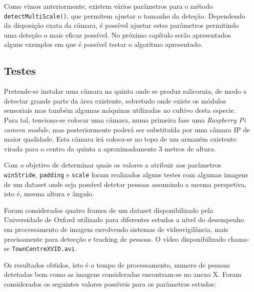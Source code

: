Como vimos anteriormente, existem vários parâmetros para o método \linebreak \texttt{detectMultiScale()}, que permitem ajustar o tamanho da deteção. Dependendo da disposição exata da câmara, é possível ajustar estes parâmetros permitindo uma deteção o mais eficaz possível. No próximo capítulo serão apresentados alguns exemplos em que é possível testar o algoritmo apresentado.  




\iffalse


\subsection{Testes}

Pretende-se instalar uma câmara na quinta onde se produz salicornia, de modo a detectar grande parte da área existente, sobretudo onde existe os módulos sensoriais mas também algumas máquinas utilizadas no cultivo desta especie. Para tal, tenciona-se colocar uma câmara, numa primeira fase uma \textit{Raspberry Pi camera module}, mas posteriormente poderá ser substituída por uma câmara IP de maior qualidade. Esta câmara irá coloca-se no topo de um armazém existente virada para o centro da quinta a aproximadamente 3 metros de altura. 

Com o objetivo de determinar quais os valores a atribuir aos parâmetros \texttt{winStride}, \texttt{padding} e \texttt{scale} foram realizados alguns testes com algumas imagens de um dataset onde seja possível detetar pessoas assumindo a mesma perspetiva, isto é, mesma altura e ângulo.  

Foram considerados quatro frames de um dataset disponibilizado pela Universidade de Oxford utilizado para diferentes estudos a nível do desempenho em processamento de imagem envolvendo sistemas de videovigilância, mais precisamente para detecção e tracking de pessoas\cite{imagProccdata}. O vídeo disponibilizado chama-se \texttt{TownCentreXVID.avi}. 

Os resultados obtidos, isto é o tempo de processamento, numero de pessoas detetadas bem como as imagens consideradas encontram-se no anexo X. Foram considerados os seguintes valores possíveis para os parâmetros estudos: 

